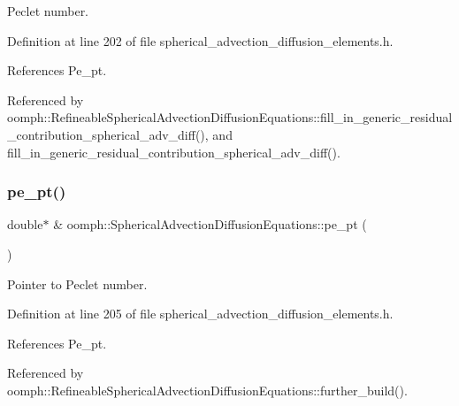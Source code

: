 Peclet number. 



Definition at line 202 of file spherical\+\_\+advection\+\_\+diffusion\+\_\+elements.\+h.



References Pe\+\_\+pt.



Referenced by oomph\+::\+Refineable\+Spherical\+Advection\+Diffusion\+Equations\+::fill\+\_\+in\+\_\+generic\+\_\+residual\+\_\+contribution\+\_\+spherical\+\_\+adv\+\_\+diff(), and fill\+\_\+in\+\_\+generic\+\_\+residual\+\_\+contribution\+\_\+spherical\+\_\+adv\+\_\+diff().

\mbox{\label{classoomph_1_1SphericalAdvectionDiffusionEquations_aefe9930f320bf5931f853461253951ef}} 
\subsubsection{\texorpdfstring{pe\+\_\+pt()}{pe\_pt()}}
{\footnotesize\ttfamily double$\ast$ \& oomph\+::\+Spherical\+Advection\+Diffusion\+Equations\+::pe\+\_\+pt (\begin{DoxyParamCaption}{ }\end{DoxyParamCaption})\hspace{0.3cm}{\ttfamily [inline]}}



Pointer to Peclet number. 



Definition at line 205 of file spherical\+\_\+advection\+\_\+diffusion\+\_\+elements.\+h.



References Pe\+\_\+pt.



Referenced by oomph\+::\+Refineable\+Spherical\+Advection\+Diffusion\+Equations\+::further\+\_\+build().

\mbox{\label{classoomph_1_1SphericalAdvectionDiffusionEquations_a7f7a29ec80961ed10841bd5e2ba9f51c}} 
